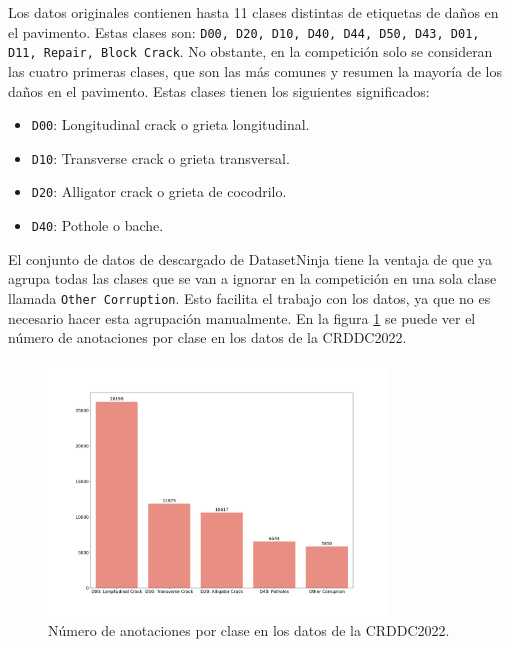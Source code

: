 Los datos originales contienen hasta 11 clases distintas de etiquetas de daños en el pavimento. Estas clases son: \texttt{D00, D20, D10, D40, D44, D50, D43, D01, D11, Repair, Block Crack}. No obstante, en la competición solo se consideran las cuatro primeras clases, que son las más comunes y resumen la mayoría de los daños en el pavimento. Estas clases tienen los siguientes significados:

\begin{itemize}
    \item \texttt{D00}: Longitudinal crack o grieta longitudinal.
    \item \texttt{D10}: Transverse crack o grieta transversal.
    \item \texttt{D20}: Alligator crack o grieta de cocodrilo.
    \item \texttt{D40}: Pothole o bache.
\end{itemize}

El conjunto de datos de descargado de DatasetNinja tiene la ventaja de que ya agrupa todas las clases que se van a ignorar en la competición en una sola clase llamada \texttt{Other Corruption}. Esto facilita el trabajo con los datos, ya que no es necesario hacer esta agrupación manualmente. En la figura \ref{fig:datasetNinja_class_count_bar} se puede ver el número de anotaciones por clase en los datos de la CRDDC2022.

\begin{figure}[H]
    \centering
    \includegraphics[width=0.8\textwidth]{graphs/datasetNinja_class_count_bar.png}
    \caption{Número de anotaciones por clase en los datos de la CRDDC2022.}
    \label{fig:datasetNinja_class_count_bar}
\end{figure}

